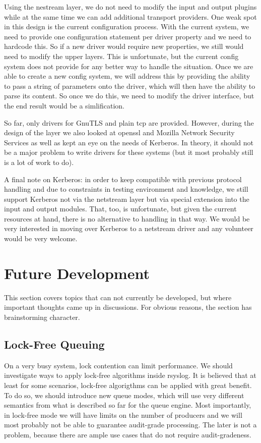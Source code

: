 \documentclass[a4paper,10pt]{article}
\begin{document}
Using the nestream layer, we do not need to modify the input and output plugins while at the same time we can add additional transport providers. One weak spot in this design is the current configuration process. With the current system, we need to provide one configuration statement per driver property and we need to hardcode this. So if a new driver would require new properties, we still would need to modify the upper layers. This is unfortunate, but the current config system does not provide for any better way to handle the situation. Once we are able to create a new config system, we will address this by providing the ability to pass a string of parameters onto the driver, which will then have the ability to parse its content. So once we do this, we need to modify the driver interface, but the end result would be a simlification.

So far, only drivers for GnuTLS and plain tcp are provided. However, during the design of the layer we also looked at openssl and Mozilla Network Security Services as well as kept an eye on the needs of Kerberos. In theory, it should not be a major problem to write drivers for these systems (but it most probably still is a lot of work to do).

A final note on Kerberos: in order to keep compatible with previous protocol handling and due to constraints in testing environment and knowledge, we still support Kerberos not via the netstream layer but via special extension into the input and output modules. That, too, is unfortunate, but given the current resources at hand, there is no alternative to handling in that way. We would be very interested in moving over Kerberos to a netstream driver and any volunteer would be very welcome.

\section{Future Development}
This section covers topics that can not currently be developed, but where important thoughts came up in discussions. For obvious reasons, the section has brainstorming character.

\subsection{Lock-Free Queuing}
On a very busy system, lock contention can limit performance. We should investigate ways to apply lock-free algorithms inside rsyslog. It is believed that at least for some scenarios, lock-free algorigthms can be applied with great benefit. To do so, we should introduce new queue modes, which will use very different semantics from what is described so far for the queue engine. Most importantly, in lock-free mode we will have limits on the number of producers and we will most probably not be able to guarantee audit-grade processing. The later is not a problem, because there are ample use cases that do not require audit-gradeness.
\end{document}
